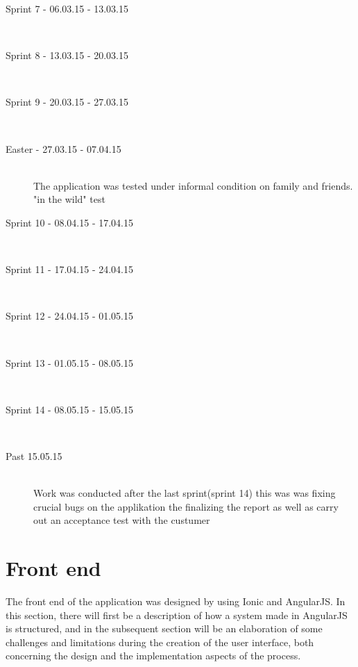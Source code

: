 \begin{description}
	\item[Sprint 7 - 06.03.15 - 13.03.15] \hfill \\ 
	
	\item[Sprint 8 - 13.03.15 - 20.03.15] \hfill \\ 

	\item[Sprint 9 - 20.03.15 - 27.03.15] \hfill \\ 
	
	\item[Easter - 27.03.15 - 07.04.15] \hfill \\ 
	The application was tested under informal condition on family and friends. "in the wild" test
	\item[Sprint 10 - 08.04.15 - 17.04.15] \hfill \\ 

	\item[Sprint 11 - 17.04.15 - 24.04.15] \hfill \\ 

	\item[Sprint 12 - 24.04.15 - 01.05.15] \hfill \\ 
	
	\item[Sprint 13 - 01.05.15 - 08.05.15] \hfill \\ 

	\item[Sprint 14 - 08.05.15 - 15.05.15] \hfill \\ 
	
	\item[Past 15.05.15] \hfill \\ 
	Work was conducted after the last sprint(sprint 14) this was was fixing crucial bugs on the applikation the finalizing the report as well as carry out an acceptance test  with the custumer
	
\end{description}


\section{Front end}

The front end of the application was designed by using Ionic and AngularJS. In this section, there will first be a description of how a system made in AngularJS is structured, and in the subsequent section will be an elaboration of some challenges and limitations during the creation of the user interface, both concerning the design and the implementation aspects of the process.

